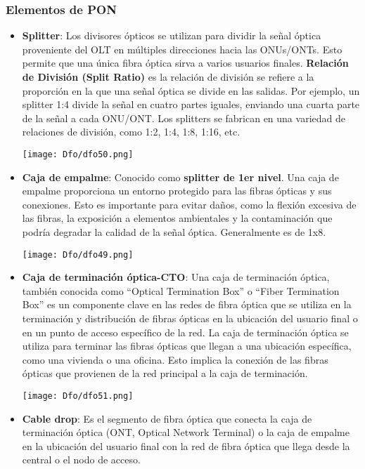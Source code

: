 \documentclass[
	12pt, %
	fleqn, %
	a4paper, %
	oneside, %
]{LegrandOrangeBook}
\begin{document}
\subsubsection{Elementos de PON}
\begin{itemize}
\item \textbf{Splitter}: Los divisores ópticos se utilizan para dividir la señal óptica proveniente del OLT en múltiples direcciones hacia las ONUs/ONTs. Esto permite que una única fibra óptica sirva a varios usuarios finales. \textbf{Relación de División (Split Ratio)} es la relación de división se refiere a la proporción en la que una señal óptica se divide en las salidas. Por ejemplo, un splitter 1:4 divide la señal en cuatro partes iguales, enviando una cuarta parte de la señal a cada ONU/ONT. Los splitters se fabrican en una variedad de relaciones de división, como 1:2, 1:4, 1:8, 1:16, etc.
\begin{center}
\texttt{[image: Dfo/dfo50.png]}
\end{center}
\item \textbf{Caja de empalme}: Conocido como \textbf{splitter de 1er nivel}. Una caja de empalme proporciona un entorno protegido para las fibras ópticas y sus conexiones. Esto es importante para evitar daños, como la flexión excesiva de las fibras, la exposición a elementos ambientales y la contaminación que podría degradar la calidad de la señal óptica. Generalmente es de 1x8.
\begin{center}
\texttt{[image: Dfo/dfo49.png]}
\end{center}
\item \textbf{Caja de terminación óptica-CTO}: 
Una caja de terminación óptica, también conocida como ``Optical Termination Box'' o ``Fiber Termination Box'' es un componente clave en las redes de fibra óptica que se utiliza en la terminación y distribución de fibras ópticas en la ubicación del usuario final o en un punto de acceso específico de la red. La caja de terminación óptica se utiliza para terminar las fibras ópticas que llegan a una ubicación específica, como una vivienda o una oficina. Esto implica la conexión de las fibras ópticas que provienen de la red principal a la caja de terminación.
\begin{center}
\texttt{[image: Dfo/dfo51.png]}
\end{center}
\item \textbf{Cable drop}: Es el segmento de fibra óptica que conecta la caja de terminación óptica (ONT, Optical Network Terminal) o la caja de empalme en la ubicación del usuario final con la red de fibra óptica que llega desde la central o el nodo de acceso.

\end{itemize}
\end{document}
